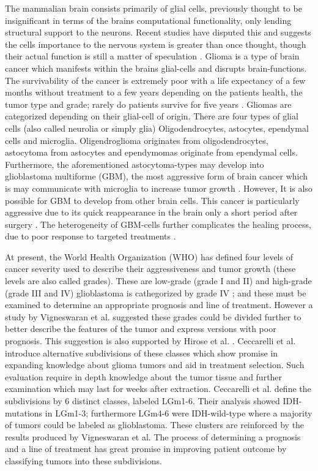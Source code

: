 The mammalian brain consists primarily of glial cells, previously thought to be insignificant in terms of the brains computational functionality, only lending structural support to the neurons. Recent studies have disputed this and suggests the cells importance to the nervous system is greater than once thought, though their actual function is still a matter of speculation \cite{glialcells}. Glioma is a type of brain cancer which manifests within the brains glial-cells and disrupts brain-functions. The survivability of the cancer is extremely poor with a life expectancy of a few months without treatment to a few years depending on the patients health, the tumor type and grade; rarely do patients survive for five years \cite{gallego2015nonsurgical, bleeker2012recent}. Gliomas are categorized depending on their glial-cell of origin. There are four types of glial cells (also called neurolia or simply glia) Oligodendrocytes, astocytes, ependymal cells and microglia. Oligendroglioma originates from oligodendrocytes, astocytoma from astocytes and ependymomas originate from ependymal cells. Furthermore, the aforementioned astocytoma-types may develop into glioblastoma multiforme (GBM), the most aggressive form of brain cancer which is may communicate with  microglia to increase tumor growth \cite{maas2020glioblastoma}. However, It is also possible for GBM to develop from other brain cells. This cancer is particularly aggressive due to its quick reappearance in the brain only a short period after surgery \cite{gallego2015nonsurgical}. The heterogeneity of GBM-cells further complicates the healing process, due to poor response to targeted treatments \cite{dirkse2019stem}.

At present, the World Health Organization (WHO) has defined four levels of cancer severity used to describe their aggressiveness and tumor growth (these levels are also called grades). These are low-grade (grade I and II) and high-grade (grade III and IV) glioblastoma is cathegorized by grade IV \cite{bleeker2012recent, gradesandpriorsubdivision}; and these must be examined to determine an appropriate prognosis and line of treatment. However a study by Vigneswaran et al. \cite{gradesandpriorsubdivision} suggested these grades could be divided further to better describe the features of the tumor and express versions with poor prognosis. This suggestion is also supported by Hirose et al. \cite{hirose2013subgrouping}. Ceccarelli et al. \cite{cellsubsets} introduce alternative subdivisions of these classes which show promise in expanding knowledge about glioma tumors and aid in treatment selection. Such evaluation require in depth knowledge about the tumor tissue and  further examination which may last for weeks after extraction. Ceccarelli et al. define the subdivisions by 6 distinct classes, labeled LGm1-6. Their analysis showed IDH-mutations in LGm1-3; furthermore LGm4-6 were IDH-wild-type where a majority of tumors could be labeled as glioblastoma. These clusters are reinforced by the results produced by Vigneswaran et al. The process of determining a prognosis and a line of treatment has great promise in improving patient outcome by classifying tumors into these subdivisions.

